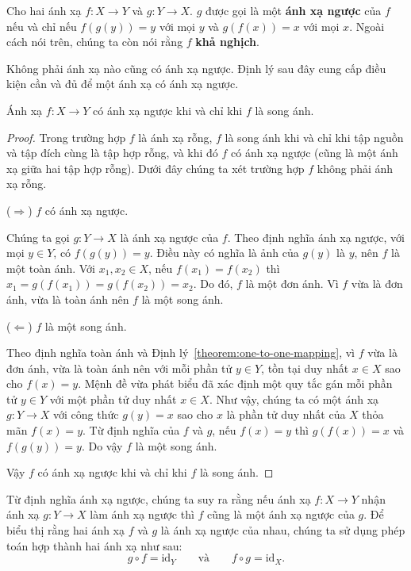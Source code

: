 \begin{definition}
    Cho hai ánh xạ $f: X\to Y$ và $g: Y\to X$. $g$ được gọi là một \textbf{ánh xạ ngược} của $f$ nếu và chỉ nếu $f(g(y)) = y$ với mọi $y$ và $g(f(x)) = x$ với mọi $x$. Ngoài cách nói trên, chúng ta còn nói rằng $f$ \textbf{khả nghịch}.
\end{definition}

Không phải ánh xạ nào cũng có ánh xạ ngược. Định lý sau đây cung cấp điều kiện cần và đủ để một ánh xạ có ánh xạ ngược.

\begin{theorem}
    Ánh xạ $f: X\to Y$ có ánh xạ ngược khi và chỉ khi $f$ là song ánh.
\end{theorem}

\begin{proof}
    Trong trường hợp $f$ là ánh xạ rỗng, $f$ là song ánh khi và chỉ khi tập nguồn và tập đích cùng là tập hợp rỗng, và khi đó $f$ có ánh xạ ngược (cũng là một ánh xạ giữa hai tập hợp rỗng). Dưới đây chúng ta xét trường hợp $f$ không phải ánh xạ rỗng.

    ($\Rightarrow$) $f$ có ánh xạ ngược.

    Chúng ta gọi $g: Y\to X$ là ánh xạ ngược của $f$. Theo định nghĩa ánh xạ ngược, với mọi $y\in Y$, có $f(g(y)) = y$. Điều này có nghĩa là ảnh của $g(y)$ là $y$, nên $f$ là một toàn ánh. Với $x_{1}, x_{2}\in X$, nếu $f(x_{1}) = f(x_{2})$ thì $x_{1} = g(f(x_{1})) = g(f(x_{2})) = x_{2}$. Do đó, $f$ là một đơn ánh. Vì $f$ vừa là đơn ánh, vừa là toàn ánh nên $f$ là một song ánh.

    ($\Leftarrow$) $f$ là một song ánh.

    Theo định nghĩa toàn ánh và Định lý~\ref{theorem:one-to-one-mapping}, vì $f$ vừa là đơn ánh, vừa là toàn ánh nên với mỗi phần tử $y\in Y$, tồn tại duy nhất $x\in X$ sao cho $f(x) = y$. Mệnh đề vừa phát biểu đã xác định một quy tắc gán mỗi phần tử $y\in Y$ với một phần tử duy nhất $x\in X$. Như vậy, chúng ta có một ánh xạ $g: Y\to X$ với công thức $g(y) = x$ sao cho $x$ là phần tử duy nhất của $X$ thỏa mãn $f(x) = y$. Từ định nghĩa của $f$ và $g$, nếu $f(x) = y$ thì $g(f(x)) = x$ và $f(g(y)) = y$. Do vậy $f$ là một song ánh.

    Vậy $f$ có ánh xạ ngược khi và chỉ khi $f$ là song ánh.
\end{proof}

Từ định nghĩa ánh xạ ngược, chúng ta suy ra rằng nếu ánh xạ $f: X\to Y$ nhận ánh xạ $g: Y\to X$ làm ánh xạ ngược thì $f$ cũng là một ánh xạ ngược của $g$. Để biểu thị rằng hai ánh xạ $f$ và $g$ là ánh xạ ngược của nhau, chúng ta sử dụng phép toán hợp thành hai ánh xạ như sau:
\[
    g\circ f = \text{id}_{Y}\qquad\text{và}\qquad f\circ g = \text{id}_{X}.
\]

